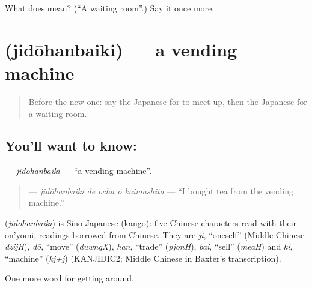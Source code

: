 \begin{tcolorbox}[breakable,colback=teal!4,colframe=teal!35!black,title={Before you move on}]
What does  mean? (\textquotedblleft{}A waiting room\textquotedblright{}.) Say it once more.
\end{tcolorbox}
\section[\texorpdfstring{\ja{じどうはんばいき} (jidōhanbaiki)}{じどうはんばいき (jidōhanbaiki)}]{ (jidōhanbaiki) — a vending machine}

\label{lesson:JA-C372-jidouhanbaiki}



\begin{quote}
Before the new one: say the Japanese for to meet up, then the Japanese for a waiting room.
\end{quote}

\subsection*{You'll want to know: }
\textbf{} — \emph{jidōhanbaiki} — \textquotedblleft{}a vending machine\textquotedblright{}.

\begin{quote}
\textbf{  } — \emph{jidōhanbaiki de ocha o kaimashita} — \textquotedblleft{}I bought tea from the vending machine.\textquotedblright{}
\end{quote}

\begin{cousinweb}
\textbf{} (\emph{jidōhanbaiki}) is Sino-Japanese (kango): five Chinese characters read with their on'yomi, readings borrowed from Chinese. They are \emph{ji}, \textquotedblleft{}oneself\textquotedblright{} (Middle Chinese \emph{dzijH}), \emph{dō}, \textquotedblleft{}move\textquotedblright{} (\emph{duwngX}), \emph{han}, \textquotedblleft{}trade\textquotedblright{} (\emph{pjonH}), \emph{bai}, \textquotedblleft{}sell\textquotedblright{} (\emph{meaH}) and \emph{ki}, \textquotedblleft{}machine\textquotedblright{} (\emph{kj+j}) (KANJIDIC2; Middle Chinese in Baxter's transcription).
\end{cousinweb}

\begin{grammarlens}[title={What you've built}]
One more word for getting around.
\end{grammarlens}

